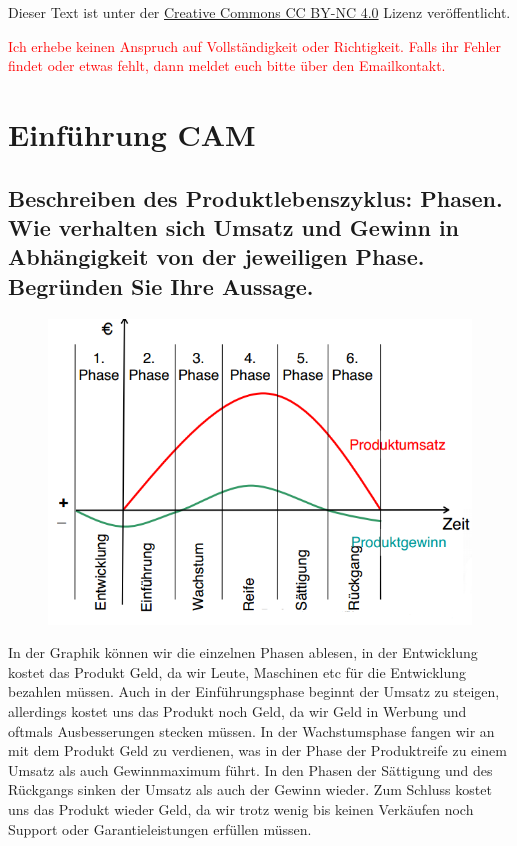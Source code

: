 
\usepackage{paralist}


\maketitle

Dieser Text ist unter der
\href{http://creativecommons.org/licenses/by-nc/4.0/}{Creative Commons CC BY-NC 4.0}
Lizenz veröffentlicht.

\textcolor{red}{%
    Ich erhebe keinen Anspruch auf Vollständigkeit oder Richtigkeit. Falls ihr
    Fehler findet oder etwas fehlt, dann meldet euch bitte über den
    Emailkontakt.
}

\tableofcontents

\newpage

\section{Einführung CAM}

\subsection*{%
    Beschreiben des Produktlebenszyklus: Phasen. Wie verhalten sich Umsatz und
    Gewinn in Abhängigkeit von der jeweiligen Phase. Begründen Sie Ihre
    Aussage.
}


\begin{figure}[h]
    \centering
    \includegraphics[scale=0.7]{Bild1_1.png}
\end{figure}

In der Graphik können wir die einzelnen Phasen ablesen, in der Entwicklung
kostet das Produkt Geld, da wir Leute, Maschinen etc für die Entwicklung
bezahlen müssen. Auch in der Einführungsphase beginnt der Umsatz zu steigen,
allerdings kostet uns das Produkt noch Geld, da wir Geld in Werbung und oftmals
Ausbesserungen stecken müssen. In der Wachstumsphase fangen wir an mit dem
Produkt Geld zu verdienen, was in der Phase der Produktreife zu einem Umsatz
als auch Gewinnmaximum führt. In den Phasen der Sättigung und des Rückgangs
sinken der Umsatz als auch der Gewinn wieder. Zum Schluss kostet uns das
Produkt wieder Geld, da wir trotz wenig bis keinen Verkäufen noch Support oder
Garantieleistungen erfüllen müssen.

